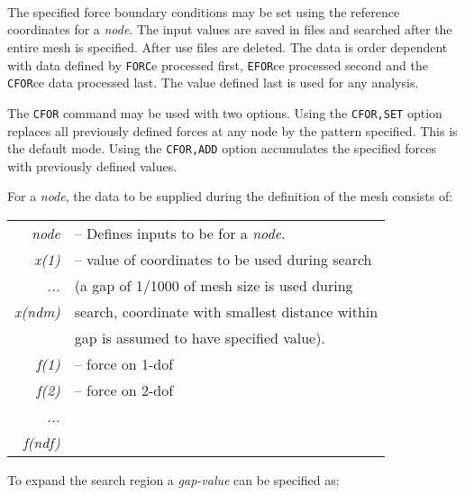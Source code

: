  \\{\smallskip}
 \\{\smallskip}
 \\{\smallskip}
\headb

The specified force boundary conditions may be set
using the reference coordinates for a {\it node}.  The input values are
saved in files and searched after the entire mesh is
specified.  After use files are deleted.
The data is order dependent with data
defined by {\tt FORC}e processed first, {\tt EFOR}ce processed second and
the {\tt CFOR}ce data processed last.  The value defined last is used for
any analysis.

The {\tt CFOR} command may be used with two options.  Using the {\tt CFOR,SET}
option replaces all previously defined forces at any node by the
pattern specified. This is the default mode.  Using the {\tt CFOR,ADD} option
accumulates the specified forces with previously defined values.

For a {\it node}, the data to be supplied during
the definition of the mesh consists of:

\begin{center}
\begin{tabular}{r l}
\it node   &-- Defines inputs to be for a {\it node}. \\
\it x(1)   &-- value of coordinates to be used during search \\
\it ...    &\quad (a gap of 1/1000 of mesh size is used during \\
\it x(ndm) &\quad search, coordinate with smallest distance within \\
           &\quad gap is assumed to have specified value). \\
\it f(1)   &-- force on 1-dof \\
\it f(2)   &-- force on 2-dof \\
\it ...     \\
\it f(ndf)  \\
\end{tabular}
\end{center}
To expand the search region a {\it gap-value} can be specified as:

